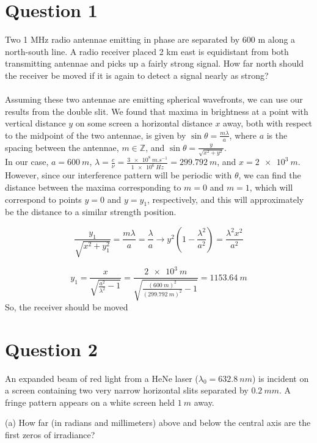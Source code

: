 \documentclass[a4paper]{article}
\begin{document}
\section*{Question 1}
Two 1 MHz radio antennae emitting in phase are separated by 600 m along a north-south line. A radio receiver placed 2 km east is equidistant from both transmitting antennae and picks up a fairly strong signal. How far north should the receiver be moved if it is again to detect a signal nearly as strong? \\\\

Assuming these two antennae are emitting spherical wavefronts, we can use our results from the double slit. We found that maxima in brightness at a point with vertical distance $y$ on some screen a horizontal distance $x$ away, both with respect to the midpoint of the two antennae, is given by $\sin \theta = \frac{m \lambda}{a}$, where $a$ is the spacing between the antennae, $m\in\mathbb{Z}$, and $\sin \theta = \frac{y}{\sqrt{x^2 + y^2}}$. \\

In our case, $a = \qty{600}{m}$, $\lambda = \frac{c}{\nu} = \frac{\qty{3e8}{m.s^{-1}}}{\qty{1e6}{Hz}} = \qty{299.792}{m}$, and $x = \qty{2e3}{m}$. However, since our interference pattern will be periodic with $\theta$, we can find the distance between the maxima corresponding to $m=0$ and $m=1$, which will correspond to points $y=0$ and $y=y_1$, respectively, and this will approximately be the distance to a similar strength position.

\[
    \frac{y_1}{\sqrt{x^2 + y_1^2}} = \frac{m \lambda}{a} = \frac{\lambda}{a} \rightarrow y^2\left(1 - \frac{\lambda^2}{a^2}\right) = \frac{\lambda^2 x^2}{a^2}
\]

\[
    y_1 = \frac{x}{\sqrt{\frac{a^2}{\lambda^2} - 1}} = \frac{\qty{2e3}{m}}{{\sqrt{\frac{(\qty{600}{m})^2}{(\qty{299.792}{m})^2} - 1}}} = \qty{1153.64}{m}
\]
So, the receiver should be moved 

\section*{Question 2}
An expanded beam of red light from a HeNe laser ($\lambda_0 = \qty{632.8}{nm}$) is incident on a screen containing two very narrow horizontal slits separated by $\qty{0.2}{mm}$. A fringe pattern appears on a white screen held $\qty{1}{m}$ away.

\quad (a) How far (in radians and millimeters) above and below the central axis are the first zeros of irradiance? \\
\end{document}
